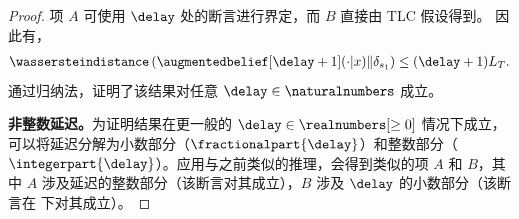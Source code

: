 \begin{proof}
    项 $A$ 可使用 $\delay$ 处的断言进行界定，而 $B$ 直接由 TLC 假设得到。
    因此有，
    \begin{align*}
        \wassersteindistance\left(\augmentedbelief[\delay+1](\cdot\vert x)\Vert \delta_{s_1} \right) \leq (\delay+1) L_T.
    \end{align*}
    通过归纳法，证明了该结果对任意 $\delay\in\naturalnumbers$ 成立。

    \noindent\textbf{非整数延迟。}\indent 为证明结果在更一般的 $\delay\in\realnumbers[\ge0]$ 情况下成立，可以将延迟分解为小数部分（$\fractionalpart{\delay}$）和整数部分（$\integerpart{\delay}$）。应用与之前类似的推理，会得到类似的项 $A$ 和 $B$，其中 $A$ 涉及延迟的整数部分（该断言对其成立），$B$ 涉及 $\delay$ 的小数部分（该断言在  下对其成立）。
\end{proof}



